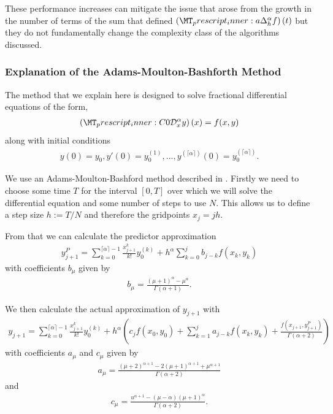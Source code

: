These performance increases can mitigate the issue that arose from the growth in the number of terms of the sum that defined $ \fracdelta{a}{\alpha}{h}{f}(t) $ but they do not fundamentally change the complexity class of the algorithms discussed.

\subsubsection{Explanation of the Adams-Moulton-Bashforth Method}

The method that we explain here is designed to solve fractional differential equations of the form,
\begin{align}
    \capder{0}{x}{\alpha}{y}(x) = f(x,y)
\end{align}
along with initial conditions 
\begin{align}
    y(0) = y_0, y'(0) = y_0^{(1)}, \ldots, y^{(\lceil \alpha \rceil)}(0) = y_0^{(\lceil \alpha \rceil)}.
\end{align}

We use an Adams-Moulton-Bashford method described in \cite{Diethelm2011}. Firstly we need to choose some time $ T $ for the interval  $ [0, T ] $ over which we will solve the differential equation and some number of steps to use $ N $. This allows us to define a step size $ h := T/N $ and therefore the gridpoints $ x_j = jh $. 

From that we can calculate the predictor approximation
\begin{align}
    \label{eq:AMB_Predictor}
    y_{j+1}^{P} = \sum_{k=0}^{\lceil \alpha \rceil - 1} \frac{x^k_{j+1}}{k!}y_0^{(k)} + h^\alpha \sum_{k=0}^j b_{j-k}f(x_k, y_k)
\end{align}
with coefficients $ b_\mu $ given by
\begin{align}
    \label{eq:AMB_y}
    b_\mu = \frac{(\mu + 1)^\alpha - \mu^\alpha}{\Gamma(\alpha + 1)}.
\end{align}

We then calculate the actual approximation of $ y_{j+1} $ with
\begin{align}
    y_{j+1} = \sum_{k=0}^{\lceil \alpha \rceil -1} \frac{x_{j+1}^{k}}{k!}y_0^{(k)} + h^\alpha \left( c_j f(x_0, y_0) + \sum_{k=1}^{j}a_{j-k}f(x_k,y_k) + \frac{f(x_{j+1}, y_{j+1}^P)}{\Gamma(\alpha + 2)}\right)
\end{align}
with coefficients $ a_\mu $ and $ c_\mu $ given by
\begin{align}
    a_\mu = \frac{(\mu + 2)^{\alpha + 1}-2(\mu + 1)^{\alpha + 1} + \mu^{\alpha + 1}}{\Gamma(\alpha + 2)}
\end{align}
and
\begin{align}
    c_\mu = \frac{u^{\alpha + 1} - (\mu - \alpha)(\mu + 1)^\alpha}{\Gamma(\alpha + 2)}.
\end{align}


